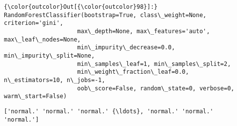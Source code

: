 \documentclass[11pt]{article}
\begin{document}
\begin{Verbatim}[commandchars=\\\{\}]
{\color{outcolor}Out[{\color{outcolor}98}]:} RandomForestClassifier(bootstrap=True, class\_weight=None, criterion='gini',
                     max\_depth=None, max\_features='auto', max\_leaf\_nodes=None,
                     min\_impurity\_decrease=0.0, min\_impurity\_split=None,
                     min\_samples\_leaf=1, min\_samples\_split=2,
                     min\_weight\_fraction\_leaf=0.0, n\_estimators=10, n\_jobs=-1,
                     oob\_score=False, random\_state=0, verbose=0, warm\_start=False)
\end{Verbatim}
            
    \begin{Verbatim}[commandchars=\\\{\}]
['normal.' 'normal.' 'normal.' {\ldots}, 'normal.' 'normal.' 'normal.']

    \end{Verbatim}
\end{document}
